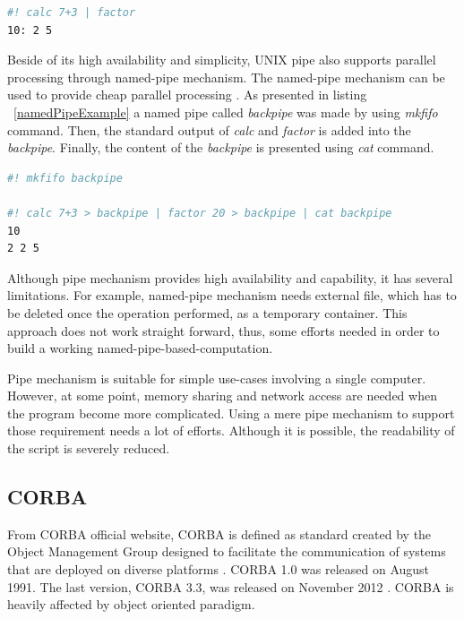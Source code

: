 \documentclass[conference]{IEEEtran}
\begin{document}
\begin{lstlisting}[caption=Unnamed pipe example, label=unnamedPipeExample, language=bash, basicstyle=\small, breaklines=true]
#! calc 7+3 | factor
10: 2 5
\end{lstlisting}

Beside of its high availability and simplicity, UNIX pipe also supports parallel
processing through named-pipe mechanism. The named-pipe mechanism can be used to 
provide cheap parallel processing \cite{conway2003parallel}. As presented in 
listing ~\ref{namedPipeExample} a named pipe called {\it backpipe} was made by using {\it mkfifo} command. 
Then, the standard output of {\it calc} and {\it factor} is added into the {\it backpipe}. Finally, the content of the {\it backpipe} is presented using {\it cat} command.

\begin{lstlisting}[caption=Named pipe example, label=namedPipeExample, language=bash, basicstyle=\small, breaklines=true]
#! mkfifo backpipe 

#! calc 7+3 > backpipe | factor 20 > backpipe | cat backpipe
10
2 2 5
\end{lstlisting}

Although pipe mechanism provides high availability and capability, 
it has several limitations. For example, named-pipe mechanism needs external file, which has to be deleted once the operation performed, as a temporary container. This approach does not work straight forward, thus, some efforts needed in order to 
build a working named-pipe-based-computation. 

Pipe mechanism is suitable for simple use-cases involving a single computer. 
However, at some point, memory sharing  and network access are needed when the program become more complicated. 
Using a mere pipe mechanism to support those requirement needs a lot of 
efforts. Although it is possible, the readability of the script is severely reduced.


\subsection{CORBA}

From CORBA official website, CORBA is defined as standard created by the Object 
Management Group designed to facilitate the communication of systems 
that are deployed on diverse platforms \cite{corba}. CORBA 1.0 was released on August 
1991. The last version, CORBA 3.3, was released on November 2012 \cite{corbaspec}.
CORBA is heavily affected by object oriented paradigm.
\end{document}
